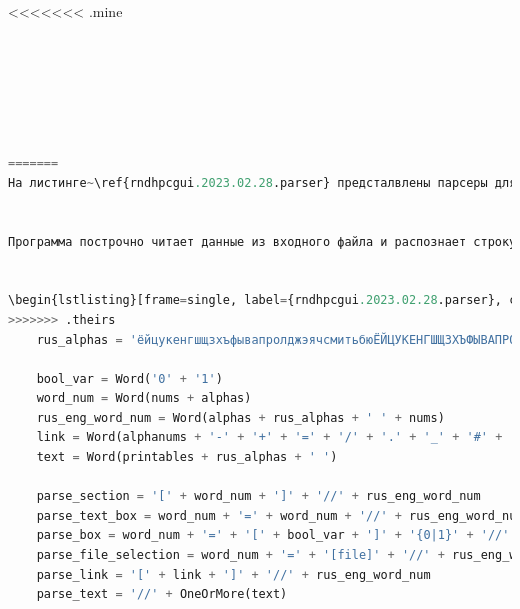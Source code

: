 <<<<<<< .mine
\begin{lstlisting}[frame=single, label={rndhpcgui.2023.02.28.parser}, caption={Парсер}, language={Python}]






=======
На листинге~\ref{rndhpcgui.2023.02.28.parser} предсталвлены парсеры для отдельных символов, текстов, а потом из отдельных частей получается парсер для строк, соответствующих определённым элементам интерфейса.


Программа построчно читает данные из входного файла и распознает строку в соответствии с шаблонами в парсере (листинг~\ref{rndhpcgui.2023.02.28.parser}). Расспознавание строк происходит в функции \textsf{parsing} (листинг~\ref{rndhpcgui.2023.02.28.parsing}) с помощью \textsf{parseString.asList()}, которая в зависимости от выбранного парсера разделяет строку на список. Функция возвращает этот список и номер распознанного элемента для дальнещей генерации.


\begin{lstlisting}[frame=single, label={rndhpcgui.2023.02.28.parser}, caption={Парсер}, language={Python}] 
>>>>>>> .theirs
	rus_alphas = 'ёйцукенгшщзхъфывапролджэячсмитьбюЁЙЦУКЕНГШЩЗХЪФЫВАПРОЛДЖЭЯЧСМИТЬБЮ'

	bool_var = Word('0' + '1')
	word_num = Word(nums + alphas)
	rus_eng_word_num = Word(alphas + rus_alphas + ' ' + nums)
	link = Word(alphanums + '-' + '+' + '=' + '/' + '.' + '_' + '#' + ':' + '&' + '?' + '%')
	text = Word(printables + rus_alphas + ' ')
	
	parse_section = '[' + word_num + ']' + '//' + rus_eng_word_num
	parse_text_box = word_num + '=' + word_num + '//' + rus_eng_word_num
	parse_box = word_num + '=' + '[' + bool_var + ']' + '{0|1}' + '//' + rus_eng_word_num
	parse_file_selection = word_num + '=' + '[file]' + '//' + rus_eng_word_num
	parse_link = '[' + link + ']' + '//' + rus_eng_word_num
	parse_text = '//' + OneOrMore(text)
\end{lstlisting}


